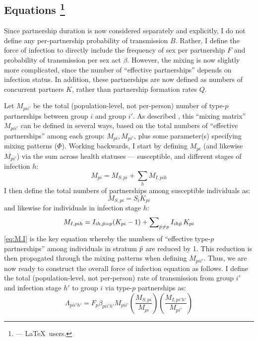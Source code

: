 \subsection[Equations]{Equations%
  \footnote{ --- \LaTeX\ users.}}\label{foi.prop.eq}
Since partnership duration is now considered separately and explicitly,
I do not define any per-partnership probability of transmission $B$.
Rather, I define the force of infection to directly include
the frequency of sex per partnership $F$ and probability of transmission per sex act $\beta$.
However, the mixing is now slightly more complicated,
since the number of ``effective partnerships'' depends on infection status.
In addition, these partnerships are now defined as numbers of concurrent partners $K$,
rather than partnership formation rates $Q$.
\par
Let $M_{pii'}$ be the total (population-level, not per-person)
number of type-$p$ partnerships between group $i$ and group $i'$.
As described , this ``mixing matrix'' $M_{pii'}$ can be defined in several ways,
based on the total numbers of ``effective partnerships'' among each group: $M_{pi}, M_{pi'}$,
plus some parameter(s) specifying mixing patterns (\eg $\Phi$).
Working backwards, I start by defining $M_{pi}$ (and likewise $M_{pi'}$) via
the sum across health statuses --- \ie susceptible, and different stages of infection $h$:
\begin{equation}\label{eq:M.SI}
  M_{pi} = M_{S,pi} + \sum_h M_{I,pih}
\end{equation}
I then define the total numbers of partnerships among susceptible individuals as:
\begin{equation}
  M_{S,pi} = S_{i} K_{pi} \label{eq:M.S}
\end{equation}
and likewise for individuals in infection stage $h$:
\begin{equation}
  M_{I,pih} = I_{ih,\bar{p}=p} (K_{pi}-1) + \sum\nolimits_{\bar{p} \ne p} I_{ih\bar{p}}\,K_{pi} \label{eq:M.I}
\end{equation}
\eqref{eq:M.I} is the key equation whereby
the  numbers of ``effective type-$p$ partnerships'' among
individuals in stratum $\bar{p}$ are reduced by 1.
This reduction is then propagated through the mixing patterns when defining $M_{pii'}$.
Thus, we are now ready to construct the overall force of infection equation as follows.
I define the total (population-level, not per-person) rate of transmission
from group $i'$ and infection stage $h'$ to group $i$ via type-$p$ partnerships as:
\begin{equation}
  \Lambda_{pii'h'} = F_p \beta_{pii'h'} M_{pii'}
  \left(\frac{M_{S,pi}}{M_{pi}}\right)
  \left(\frac{M_{I,pi'h'}}{M_{pi'}}\right)
\end{equation}
